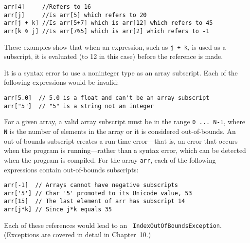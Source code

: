 \begin{jjjlisting}[26.5pc]
\begin{lstlisting}
arr[4]     //Refers to 16
arr[j]     //Is arr[5] which refers to 20
arr[j + k] //Is arr[5+7] which is arr[12] which refers to 45
arr[k % j] //Is arr[7%5] which is arr[2] which refers to -1
\end{lstlisting}
\end{jjjlisting}


\noindent These examples show that when an expression, such as {\tt j
 + k}, is used as a subscript, it is evaluated (to 12 in this case)
before the reference is made.

It is a syntax error to use a noninteger type as an array subscript.
Each of the following expressions would be invalid:

\begin{jjjlisting}[26.5pc]
\begin{lstlisting}
arr[5.0]  // 5.0 is a float and can't be an array subscript
arr["5"]  // "5" is a string not an integer
\end{lstlisting}
\end{jjjlisting}

\noindent For a given array, a valid array subscript must be in the
range \verb|0 ... N-1|, where {\tt N} is the number of elements in the
array or it is considered out-of-bounds. An out-of-bounds subscript
creates a run-time error---that is, an error that occurs when the
program is running---rather than a syntax error, which can be detected
when the program is compiled.  For the array {\tt arr}, each of the
following expressions contain out-of-bounds subscripts:

\begin{jjjlisting}
\begin{lstlisting}
arr[-1]  // Arrays cannot have negative subscripts
arr['5'] // Char '5' promoted to its Unicode value, 53
arr[15]  // The last element of arr has subscript 14
arr[j*k] // Since j*k equals 35
\end{lstlisting}
\end{jjjlisting}

\noindent Each of these references would lead to an {\tt
IndexOutOfBoundsException}.  (Exceptions are covered in detail in
Chapter~10.)




